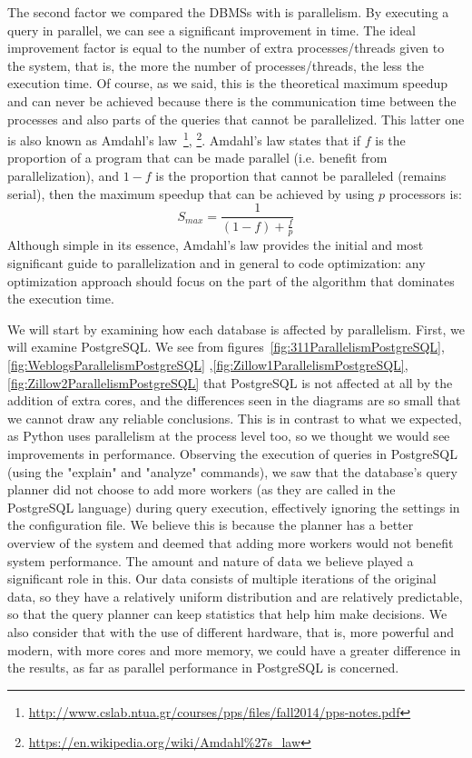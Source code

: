 
The second factor we compared the DBMSs with is parallelism. By executing a query in parallel, 
we can see a significant improvement in time. The ideal improvement factor is equal to the 
number of extra processes/threads given to the system, that is, the more the number 
of processes/threads, the less the execution time. Of course, as we said, this is the 
theoretical maximum speedup and can never be achieved because there is the communication 
time between the processes and also parts of the queries that cannot be parallelized. 
This latter one is also known as Amdahl's 
law~\footnote{\url{http://www.cslab.ntua.gr/courses/pps/files/fall2014/pps-notes.pdf}},
\footnote{\url{https://en.wikipedia.org/wiki/Amdahl\%27s\_law}}. 
Amdahl's law states that if 
$f$ is the proportion of a program that can be made parallel (i.e. benefit from parallelization), 
and $1-f$ is the proportion that cannot be paralleled (remains serial), then the maximum 
speedup that can be achieved by using $p$ processors is: 
\begin{equation}
    S_{max} = \frac{1}{\left ( 1-f \right ) + \frac{f}{p}}
\end{equation}
Although simple in its essence, Amdahl's law provides the initial and most significant 
guide to parallelization and in general to code optimization: any optimization approach 
should focus on the part of the algorithm that dominates the execution time.



We will start by examining how each database is affected by parallelism. First, we will 
examine PostgreSQL. We see from figures~\ref{fig:311ParallelismPostgreSQL},\ref{fig:WeblogsParallelismPostgreSQL}
,\ref{fig:Zillow1ParallelismPostgreSQL},\ref{fig:Zillow2ParallelismPostgreSQL} that 
PostgreSQL is not affected at all by the addition of extra cores, and the differences 
seen in the diagrams are so small that we cannot draw any reliable conclusions. 
This is in contrast to what we expected, as Python uses parallelism at the process level too, 
so we thought we would see improvements in performance. Observing the execution of queries 
in PostgreSQL (using the "explain" and "analyze" commands), we saw that the database's 
query planner did not choose to add more workers (as they are called in the PostgreSQL language) 
during query execution, effectively ignoring the settings in the configuration file. 
We believe this is because the planner has a better overview of the system and deemed 
that adding more workers would not benefit system performance. The amount and nature of data 
we believe played a significant role in this. Our data consists of multiple iterations of the 
original data, so they have a relatively uniform distribution and are relatively predictable, 
so that the query planner can keep statistics that help him make decisions. We also consider 
that with the use of different hardware, that is, more powerful and modern, with more cores and 
more memory, we could have a greater difference in the results, as far as parallel performance 
in PostgreSQL is concerned.

